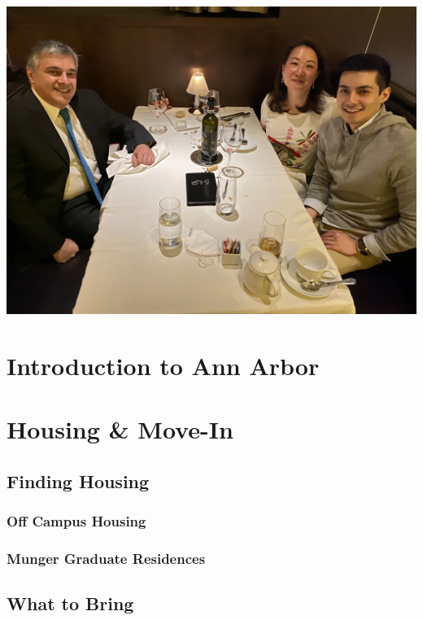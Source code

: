\documentclass[
]{book}
\begin{document}
\includegraphics{About_Me_Photo.jpeg}

\hypertarget{introduction-to-ann-arbor}{%
\chapter{Introduction to Ann Arbor}\label{introduction-to-ann-arbor}}

\hypertarget{move-in}{%
\chapter{Housing \& Move-In}\label{move-in}}

\hypertarget{finding-housing}{%
\section{Finding Housing}\label{finding-housing}}

\hypertarget{off-campus-housing}{%
\subsection{Off Campus Housing}\label{off-campus-housing}}

\hypertarget{munger-graduate-residences}{%
\subsection{Munger Graduate Residences}\label{munger-graduate-residences}}

\hypertarget{what-to-bring}{%
\section{What to Bring}\label{what-to-bring}}
\end{document}
